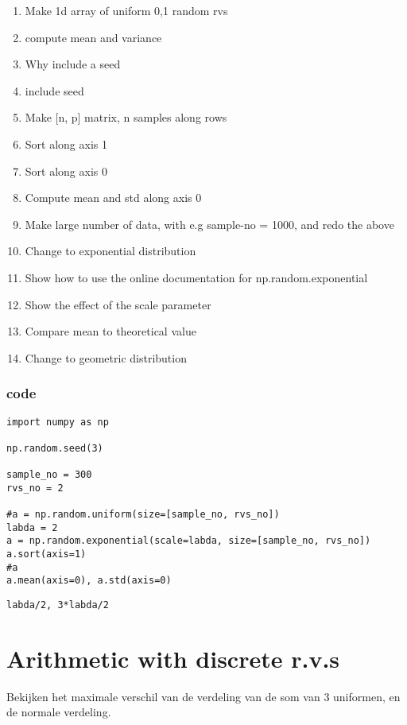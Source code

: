\documentclass[a4paper]{article}
\begin{document}
\begin{enumerate}
\item Make 1d array of uniform 0,1 random rvs
\item compute mean and variance
\item Why include a seed
\item include seed
\item Make [n, p] matrix, n samples along rows
\item Sort along axis  1
\item Sort along axis 0
\item Compute mean and std along axis 0
\item Make large number of data, with e.g sample-no = 1000, and redo the above
\item Change to exponential distribution
\item Show how to use the online documentation for np.random.exponential
\item Show the effect of the scale parameter
\item Compare mean to theoretical value
\item Change to geometric distribution
\end{enumerate}


\subsubsection{code}
\label{sec:orga01964c}


\begin{verbatim}
import numpy as np

np.random.seed(3)

sample_no = 300
rvs_no = 2

#a = np.random.uniform(size=[sample_no, rvs_no])
labda = 2
a = np.random.exponential(scale=labda, size=[sample_no, rvs_no])
a.sort(axis=1)
#a
a.mean(axis=0), a.std(axis=0)
\end{verbatim}

\begin{verbatim}
labda/2, 3*labda/2
\end{verbatim}


\section{Arithmetic with discrete r.v.s}
\label{sec:orgb53976d}


Bekijken het maximale verschil van de verdeling van de som van 3 uniformen, en de normale verdeling. 
\end{document}
